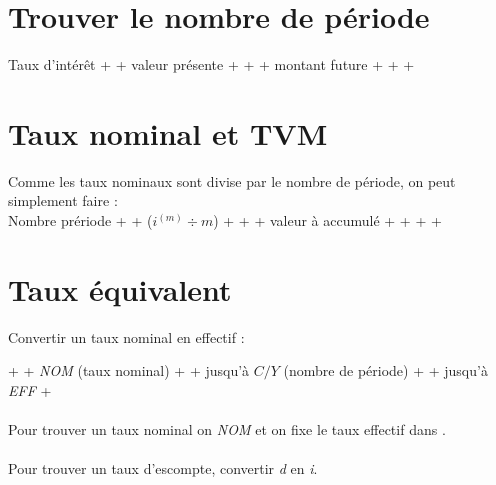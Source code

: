 \documentclass[11pt,french]{report}
\begin{document}
\section{Trouver le nombre de période}
Taux d'intérêt +  + valeur présente + \fbox{+$ / $- } +  + montant future +  +  + 

\section{Taux nominal et TVM}
Comme les taux nominaux sont divise par le nombre de période, on peut simplement faire : \\
Nombre prériode +  + ($i^{(m)} \div m$) + \fbox{=} +  + valeur à accumulé + \fbox{+$ / $-} +  +  + 
\\

\section{Taux équivalent}

Convertir un taux nominal en effectif : 

 +  + \emph{NOM} (taux nominal) +  + \fbox{$\Downarrow$} jusqu'à \emph{$C / Y$} (nombre de période) +  + \fbox{$\Uparrow$} jusqu'à \emph{EFF} + 
\\
\\ Pour trouver un taux nominal on  \emph{NOM} et on fixe le taux effectif dans .
\\
\\ Pour trouver un taux d'escompte, convertir \emph{d} en \emph{i}.
\end{document}
